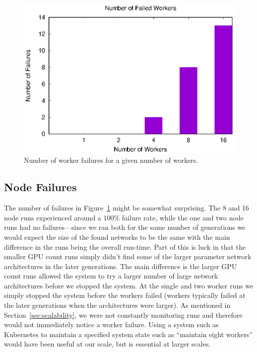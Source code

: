 \documentclass[conference]{IEEEtran}
\begin{document}
\begin{figure}
  \centering
  \includegraphics[width=\columnwidth]{result/output/failures}
  \caption{Number of worker failures for a given number of workers.}
  \label{fig:failures}
\end{figure}

\subsection{Node Failures}
The number of failures in Figure~\ref{fig:failures} might be somewhat surprising.
The 8 and 16 node runs experienced around a 100\% failure rate, while the one
and two node runs had no failures---since we ran both for the same number of
generations we would expect the size of the found networks to be the same with
the main difference in the runs being the overall run-time. Part of this is
luck in that the smaller GPU count runs simply didn't find some of the larger
parameter network architectures in the later generations.
The main difference is the larger GPU count runs allowed
the system to try a larger number of large network architectures before we
stopped the system. At the single and two worker runs we simply stopped the
system before the workers failed (workers typically failed at the later generations
when the architectures were larger). As mentioned in Section~\ref{sec:scalability},
we were not constantly monitoring runs and therefore would not immediately notice
a worker failure. Using a system such as Kubernetes to maintain a specified
system state such as ``maintain eight workers'' would have been useful at our
scale, but is essential at larger scales.
\end{document}
